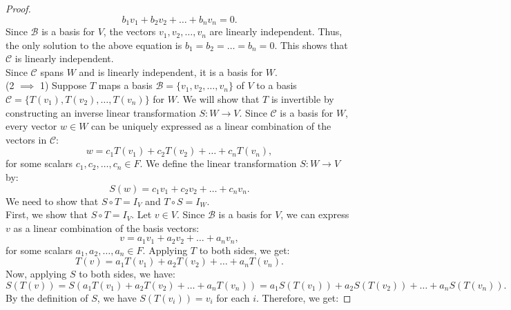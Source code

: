 \documentclass{article}
\begin{document}
\begin{enumerate}[(a)]
\begin{proof}
        \begin{equation*}
            b_1 v_1 + b_2 v_2 + \ldots + b_n v_n = 0.
        \end{equation*}
        Since $\mathscr{B}$ is a basis for $V$, the vectors $v_1, v_2, \ldots, v_n$ are linearly independent. Thus, the only solution to the above equation is $b_1 = b_2 = \ldots = b_n = 0$. This shows that $\mathscr{C}$ is linearly independent. \\
        Since $\mathscr{C}$ spans $W$ and is linearly independent, it is a basis for $W$. \\
        (2 $\implies$ 1) Suppose $T$ maps a basis $\mathscr{B} = \{ v_1, v_2, \ldots, v_n \}$ of $V$ to a basis $\mathscr{C} = \{ T(v_1), T(v_2), \ldots, T(v_n) \}$ for $W$. We will show that $T$ is invertible by constructing an inverse linear transformation $S: W \to V$. Since $\mathscr{C}$ is a basis for $W$, every vector $w \in W$ can be uniquely expressed as a linear combination of the vectors in $\mathscr{C}$: 
        \begin{equation*}
            w = c_1 T(v_1) + c_2 T(v_2) + \ldots + c_n T(v_n),
        \end{equation*}
        for some scalars $c_1, c_2, \ldots, c_n \in F$. We define the linear transformation $S: W \to V$ by:
        \begin{equation*}
            S(w) = c_1 v_1 + c_2 v_2 + \ldots + c_n v_n.
        \end{equation*}
        We need to show that $S \circ T = I_V$ and $T \circ S = I_W$. \\
        First, we show that $S \circ T = I_V$. Let $v \in V$. Since $\mathscr{B}$ is a basis for $V$, we can express $v$ as a linear combination of the basis vectors:
        \begin{equation*}
            v = a_1 v_1 + a_2 v_2 + \ldots + a_n v_n,
        \end{equation*}
        for some scalars $a_1, a_2, \ldots, a_n \in F$. Applying $T$ to both sides, we get:
        \begin{equation*}
            T(v) = a_1 T(v_1) + a_2 T(v_2) + \ldots + a_n T(v_n).
        \end{equation*}
        Now, applying $S$ to both sides, we have:
        \begin{equation*}
            S(T(v)) = S(a_1 T(v_1) + a_2 T(v_2) + \ldots + a_n T(v_n)) = a_1 S(T(v_1)) + a_2 S(T(v_2)) + \ldots + a_n S(T(v_n)).
        \end{equation*}
        By the definition of $S$, we have $S(T(v_i)) = v_i$ for each $i$. Therefore, we get:

\end{proof}
\end{enumerate}
\end{document}
